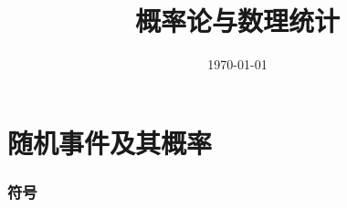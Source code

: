 \documentclass{article}
\title{概率论与数理统计}
\author{}
\date{\today}
\begin{document}
\hypersetup{
    hidelinks,
    allcolors = black,
    breaklinks = true
}

\newtheorem{definition}{Definition}[subsection]
\newtheorem{theorem}{Theorem}[subsection]
\newtheorem{corollary}{Corollary}[theorem]
\renewcommand{\proofname}{\indent\bf Proof}

\def\e{\mathrm e}
\def\i{\mathrm i}
\def\j{\mathrm j}
\def\d{\mathrm d}
\def\C{\mathrm C}
\def\sr{\mathbb R}
\def\sn{\mathbb N}
\def\snp{\mathbb N^+}
\def\sc{\mathbb C}
\def\sz{\mathbb Z}
\def\impint{\int\limits_{-\infty}^{+\infty}}

\newcommand{\abs}[1]{\left|#1\right|}
\newcommand{\pare}[1]{\left(#1\right)}
\newcommand{\conditionset}[2]{\left\{#1|#2\right\}}

\def\pa{P\pare{A}}

\begin{titlepage}
    \maketitle
\end{titlepage}

\tableofcontents
\newpage

\part{随机事件及其概率}

\section{符号}
\end{document}
